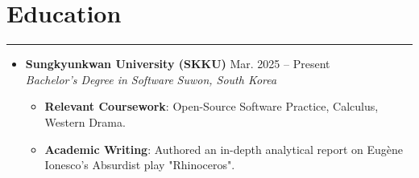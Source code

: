 \documentclass[letterpaper, 10pt]{article}
\begin{document}
\section*{Education}
\hrule
\vspace{4pt}
\begin{itemize}
    \item \textbf{Sungkyunkwan University (SKKU)} \hfill Mar. 2025 -- Present \\
    \textit{Bachelor's Degree in Software} \hfill \textit{Suwon, South Korea}
    \begin{itemize}
        \item \textbf{Relevant Coursework}: Open-Source Software Practice, Calculus, Western Drama.
        \item \textbf{Academic Writing}: Authored an in-depth analytical report on Eugène Ionesco's Absurdist play "Rhinoceros".
    \end{itemize}
\end{itemize}
\end{document}
